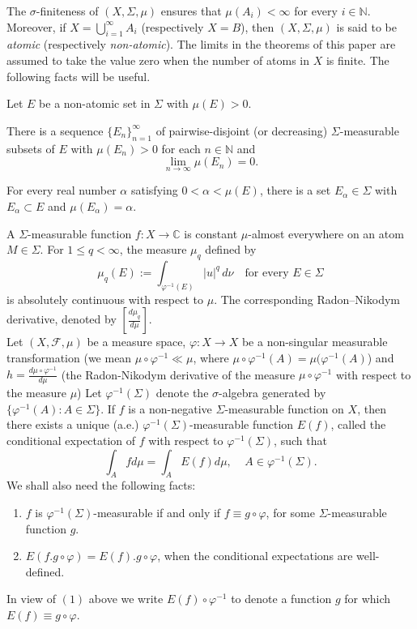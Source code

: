 \documentclass{amsart}
\theoremstyle{definition}\newtheorem{defn}[thm]{Definition}
\theoremstyle{remark}
\numberwithin{equation}{section}
\begin{document}
The $\sigma$-finiteness of $(X,\Sigma,\mu)$ ensures that $\mu(A_i) < \infty$ for every
$i \in \mathbb{N}$. Moreover, if $X = \bigcup_{i=1}^{\infty} A_i$ (respectively $X = B$),
then $(X,\Sigma,\mu)$ is said to be \emph{atomic} (respectively \emph{non-atomic}).
The limits in the theorems of this paper are assumed to take the value zero when the
number of atoms in $X$ is finite. The following facts will be useful.


 Let $E$ be a non-atomic set in $\Sigma$ with $\mu(E) > 0$.

 There is a sequence $\{E_n\}_{n=1}^{\infty}$ of pairwise-disjoint (or decreasing)
$\Sigma$-measurable subsets of $E$ with $\mu(E_n) > 0$ for each $n \in \mathbb{N}$ and
\[
\lim_{n \to \infty} \mu(E_n) = 0.
\]

 For every real number $\alpha$ satisfying $0 < \alpha < \mu(E)$, there is a set
$E_\alpha \in \Sigma$ with $E_\alpha \subset E$ and $\mu(E_\alpha) = \alpha$.


 A $\Sigma$-measurable function $f : X \to \mathbb{C}$ is constant
$\mu$-almost everywhere on an atom $M \in \Sigma$.
For $1 \le q < \infty$, the measure $\mu_q$ defined by
\[
\mu_q(E) := \int_{\varphi^{-1}(E)} |u|^q \, d\nu
\quad \text{for every } E \in \Sigma
\]
is absolutely continuous with respect to $\mu$. The corresponding Radon--Nikodym
derivative, denoted by $\left[\frac{d\mu_q}{d\mu}\right]$.\\

Let $(X, \mathcal{F}, \mu)$ be a measure space, $\varphi:X\rightarrow X$ be a non-singular measurable transformation (we mean $\mu\circ\varphi^{-1}\ll\mu$, where $\mu\circ\varphi^{-1}(A)=\mu(\varphi^{-1}(A)$) and $h=\frac{d\mu\circ\varphi^{-1}}{d\mu}$ (the Radon-Nikodym derivative of the measure $\mu\circ\varphi^{-1}$ with respect to the measure $\mu$) 
Let $\varphi^{-1}(\Sigma)$ denote the $\sigma$-algebra generated by $\{\varphi^{-1}(A): A\in \Sigma\}$. If $f$ is a non-negative $\Sigma$-measurable function on $X$, then there exists a unique (a.e.) $\varphi^{-1}(\Sigma)$-measurable function $E(f)$, called the conditional expectation 
of $f$ with respect to $\varphi^{-1}(\Sigma)$, such that 
$$\int_Afd\mu=\int_AE(f)d\mu, \ \ \ \ \ A\in \varphi^{-1}(\Sigma).$$ 
We shall also need the following facts:
\begin{enumerate}
  \item $f$ is $\varphi^{-1}(\Sigma)$-measurable if and only if $f\equiv g\circ \varphi$, for some $\Sigma$-measurable function $g$.
  \item $E(f.g\circ\varphi)=E(f).g\circ\varphi$, when the conditional expectations are well-defined.
  \end{enumerate}
  In view of $(1)$ above we write $E(f)\circ\varphi^{-1}$ to denote a function $g$ for which $E(f)\equiv g\circ \varphi$.\\ 
\end{document}

